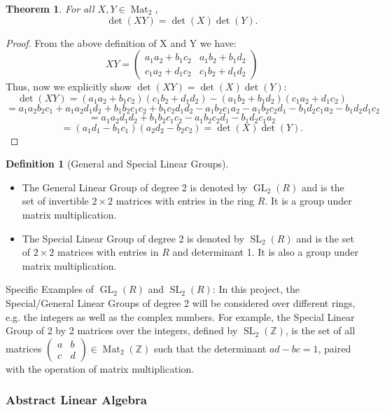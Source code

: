 \documentclass{article}
\newtheorem{thm}{Theorem}[section]
\theoremstyle{definition}
\newtheorem{definition}{Definition}[section]
\theoremstyle{definition}
\theoremstyle{definition}
\newcommand{\SLZ}{\operatorname{SL}_2(\mathbb{Z})}
\newcommand{\mat}{\operatorname{Mat}}
\newcommand{\GL}{\operatorname{GL}}
\newcommand{\SL}{\operatorname{SL}}
\newcommand{\Mabcd}{\begin{pmatrix} a&b\\c&d \end{pmatrix}}
\begin{document}
\begin{thm} 
   For all $X,Y\in\mat_2$,
   $$\det(XY)=\det(X)\det(Y).$$
\end{thm}
\begin{proof}
    
From the above definition of X and Y we have:
$$XY=\begin{pmatrix} {a_1a_2+b_1c_2}&{a_1b_2+b_1d_2}\\{c_1a_2+d_1c_2}&{c_1b_2+d_1d_2} \end{pmatrix}$$
Thus, now we explicitly show $\det(XY)=\det(X)\det(Y)$:
$$\det(XY)=(a_1a_2+b_1c_2)(c_1b_2+d_1d_2)-(a_1b_2+b_1d_2)(c_1a_2+d_1c_2)$$
$$=a_1a_2b_2c_1+a_1a_2d_1d_2+b_1b_2c_1c_2+b_1c_2d_1d_2-a_1b_2c_1a_2-a_1b_2c_2d_1-b_1d_2c_1a_2-b_1d_2d_1c_2$$
$$=a_1a_2d_1d_2+b_1b_2c_1c_2-a_1b_2c_2d_1-b_1d_2c_1a_2$$
$$=(a_1d_1-b_1c_1)(a_2d_2-b_2c_2)=\det(X)\det(Y).$$
\end{proof}

\begin{definition}[General and Special Linear Groups]
   \leavevmode
    \begin{itemize}
        \item The General Linear Group of degree 2 is denoted by $\GL_2(R)$ and is the set of invertible $2 \times 2$ matrices with entries in the ring $R$. It is a group under matrix multiplication. 
        \item The Special Linear Group of degree 2 is denoted by $\SL_2(R)$ and is the set of $2 \times 2$ matrices with entries in $R$ and determinant 1. It is also a group under matrix multiplication.
    \end{itemize}
\end{definition}


Specific Examples of $\GL_2(R)$ and  $\SL_2(R)$:
    In this project, the Special/General Linear Groups of degree 2 will be considered over different rings, e.g. the integers as well as the complex numbers.
    \newline\newline
    For example, the Special Linear Group of 2 by 2 matrices over the integers, defined by $\SLZ$, is the set of all matrices $\Mabcd\in \mat_2(\mathbb{Z})$ such that the determinant $ad-bc=1$, paired with the operation of matrix multiplication. 


\subsubsection{Abstract Linear Algebra}
\end{document}
